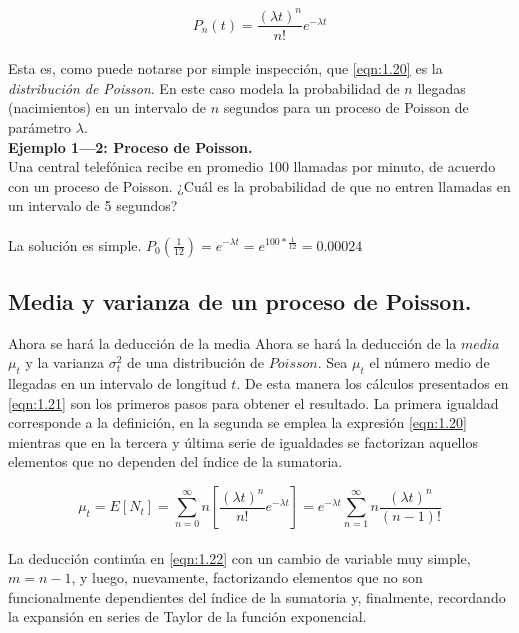 \begin{equation}
    P_{n}\left ( t \right )=\frac{ \left ( \lambda t  \right )^{n} }{n!} e^{-\lambda t}
    \label{eqn:1.20}
\end{equation}
\\
Esta es, como puede notarse por simple inspección, que \ref{eqn:1.20} es la  {\em distribución de Poisson}. En este caso modela la probabilidad de $n$ llegadas (nacimientos) en un intervalo de $n$ segundos para un proceso de Poisson de parámetro $ \lambda $.
\\
\textbf{Ejemplo 1—2: Proceso de Poisson.}
\\
Una central telefónica recibe en promedio 100 llamadas por minuto, de acuerdo con un proceso de Poisson. ¿Cuál es la probabilidad de que no entren llamadas en un intervalo de 5 segundos?
\\\\
La solución es simple. $P_{0}\left ( \frac{1}{12} \right )=e^{-\lambda t}=e^{100*\frac{1}{12}}=0.00024$

\subsection{Media y varianza de un proceso de Poisson.}
Ahora se hará la deducción de la media Ahora se hará la deducción de la $media$ $\mu _{t}$ y la varianza $\sigma _{t}^{2}$ de una distribución de $Poisson.$
Sea $\mu _{t}$ el número medio de llegadas en un intervalo de longitud $t$. De esta manera los cálculos presentados en \ref{eqn:1.21} son los primeros pasos para obtener el resultado. La primera igualdad corresponde a la definición, en la segunda se emplea la expresión \ref{eqn:1.20} mientras que en la tercera y última serie de igualdades se factorizan aquellos elementos que no dependen del índice de la sumatoria.

\begin{equation}
    \mu_{t}=E\left [ N_{t} \right ]=\sum_{n=0}^{\infty}n\left [ \frac{\left ( \lambda t \right )^{n}}{n!}e^{-\lambda t} \right ]=e^{-\lambda t}\sum_{n=1}^{\infty}n\frac{\left ( \lambda t \right )^{n}}{\left ( n-1 \right )!}
    \label{eqn:1.21}
\end{equation}
\\
La deducción continúa en \ref{eqn:1.22} con un cambio de variable muy simple, $ m = n-1 $, y luego, nuevamente, factorizando elementos que no son funcionalmente dependientes del índice de la sumatoria y, finalmente, recordando la expansión en series de Taylor de la función exponencial.

